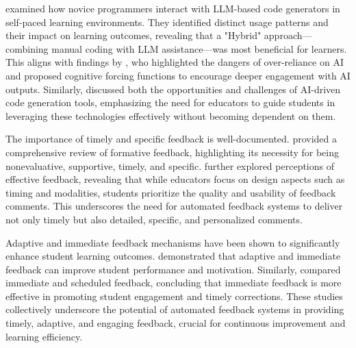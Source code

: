 \documentclass[manuscript,screen,review]{acmart}
\begin{document}
%
%
\citet{kazemitabaar:2024:HowNovicesUse} examined how novice programmers interact with LLM-based code generators in self-paced learning environments. They identified distinct usage patterns and their impact on learning outcomes, revealing that a "Hybrid" approach—combining manual coding with LLM assistance—was most beneficial for learners. This aligns with findings by \citet{bucinca:2021:TrustThinkCognitive}, who highlighted the dangers of over-reliance on AI and proposed cognitive forcing functions to encourage deeper engagement with AI outputs. Similarly, \citet{becker:2023:ProgrammingHardLeast} discussed both the opportunities and challenges of AI-driven code generation tools, emphasizing the need for educators to guide students in leveraging these technologies effectively without becoming dependent on them.


%
The importance of timely and specific feedback is well-documented. \citet{shute:2008:FocusFormativeFeedback} provided a comprehensive review of formative feedback, highlighting its necessity for being nonevaluative, supportive, timely, and specific. \citet{dawson:2019:WhatMakesEffective} further explored perceptions of effective feedback, revealing that while educators focus on design aspects such as timing and modalities, students prioritize the quality and usability of feedback comments. This underscores the need for automated feedback systems to deliver not only timely but also detailed, specific, and personalized comments.


%
Adaptive and immediate feedback mechanisms have been shown to significantly enhance student learning outcomes. \citet{marwan:2020:AdaptiveImmediateFeedback} demonstrated that adaptive and immediate feedback can improve student performance and motivation. Similarly, \citet{leinonen:2022:ComparisonImmediateScheduled} compared immediate and scheduled feedback, concluding that immediate feedback is more effective in promoting student engagement and timely corrections. These studies collectively underscore the potential of automated feedback systems in providing timely, adaptive, and engaging feedback, crucial for continuous improvement and learning efficiency.
\end{document}

